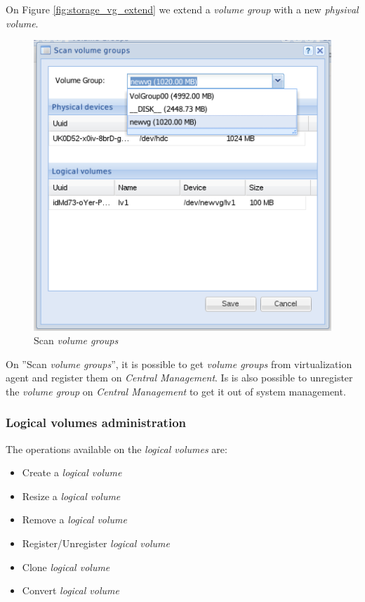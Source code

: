 On Figure \ref{fig:storage_vg_extend} we extend a \emph{volume group} with a new \emph{physival volume}.

\begin{figure}[H]
        \begin{center}
        \includegraphics[scale=0.45]{screenshots/node_storage_vg_search.png}
        \caption{Scan \emph{volume groups}}
        \label{fig:storage_vg_search}
        \end{center}
\end{figure}

On ''Scan \emph{volume groups}'', it is possible to get \emph{volume groups} from virtualization agent and register them on \emph{Central Management}.
Is is also possible to unregister the \emph{volume group} on \emph{Central Management} to get it out of system management.


\subsubsection{Logical volumes administration}

The operations available on the \emph{logical volumes} are:
\begin{itemize}
	\item Create a \emph{logical volume}
	\item Resize a \emph{logical volume}
	\item Remove a \emph{logical volume}
	\item Register/Unregister \emph{logical volume}
    \item Clone \emph{logical volume}
    \item Convert \emph{logical volume}
\end{itemize}

